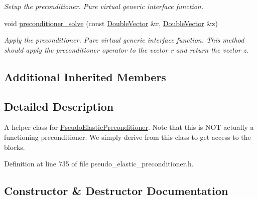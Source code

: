 \begin{DoxyCompactItemize}
\begin{DoxyCompactList}\small\item\em Setup the preconditioner. Pure virtual generic interface function. \end{DoxyCompactList}\item 
void \hyperlink{classoomph_1_1PseudoElasticPreconditionerScalingHelperOld_a185bc08ce33f220d9ef61745b46e0633}{preconditioner\+\_\+solve} (const \hyperlink{classoomph_1_1DoubleVector}{Double\+Vector} \&r, \hyperlink{classoomph_1_1DoubleVector}{Double\+Vector} \&z)
\begin{DoxyCompactList}\small\item\em Apply the preconditioner. Pure virtual generic interface function. This method should apply the preconditioner operator to the vector r and return the vector z. \end{DoxyCompactList}\end{DoxyCompactItemize}
\subsection*{Additional Inherited Members}


\subsection{Detailed Description}
A helper class for \hyperlink{classoomph_1_1PseudoElasticPreconditioner}{Pseudo\+Elastic\+Preconditioner}. Note that this is N\+OT actually a functioning preconditioner. We simply derive from this class to get access to the blocks. 

Definition at line 735 of file pseudo\+\_\+elastic\+\_\+preconditioner.\+h.



\subsection{Constructor \& Destructor Documentation}
\mbox{\label{classoomph_1_1PseudoElasticPreconditionerScalingHelperOld_a90a89541c9067f06446c2a0e9e3c5398}} 
